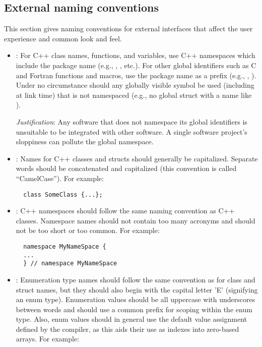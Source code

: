 %
\subsection{External naming conventions}
\label{sec:ExternalNamingConventions}
%

This section gives naming conventions for external interfaces that
affect the user experience and common look and feel.

\begin{itemize}

{}\item\NCNamespaceAllNames: For C++ class names, functions, and
variables, use C++ namespaces which include the package name (e.g.,
{}, {}, etc.).  For other
global identifiers such as C and Fortran functions and macros, use the
package name as a prefix (e.g., {},
{}).  Under no circumstance should any globally
visible symbol be used (including at link time) that is not namespaced
(e.g., no global struct with a name like {}).

{}\textit{Justification}: Any software that does not namespace its
global identifiers is unsuitable to be integrated with other software.
A single software project's sloppiness can pollute the global
namespace.

{}\item\NCClassNames: Names for C++ classes and structs should
generally be capitalized.  Separate words should be concatenated and
capitalized (this convention is called ``CamelCase'').  For example:

{\small\begin{verbatim}
  class SomeClass {...};
\end{verbatim}}


{}\item\NCNamespaceNames: C++ namespaces should follow the same naming
convention as C++ classes.  Namespace names should not contain too many
acronyms and should not be too short or too common.  For example:

{\small\begin{verbatim}
  namespace MyNameSpace {
  ...
  } // namespace MyNameSpace 
\end{verbatim}}


{}\item\NCEnumNames: Enumeration type names should follow the same
convention as for class and struct names, but they should also begin
with the capital letter 'E' (signifying an enum type).  Enumeration
values should be all uppercase with underscores between words and
should use a common prefix for scoping within the enum type.  Also,
enum values should in general use the default value assignment defined
by the compiler, as this aids their use as indexes into zero-based
arrays.  For example:


\end{itemize}
